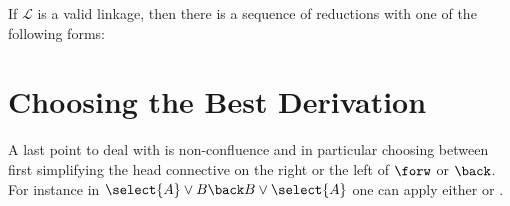 \begin{theorem}[Productivity]\label{thm:productivity}
If $\mathcal{L}$ is a valid linkage, then there
is a sequence of reductions with one of the following forms:
\end{theorem}




\section{Choosing the Best Derivation}

A last point to deal with is non-confluence and in particular choosing
between first simplifying the head connective on the right or the left
of $\forw$ or $\back$. For instance in
$\select{A}\lor B \back B\lor\select{A}$ one can apply either
 or .

